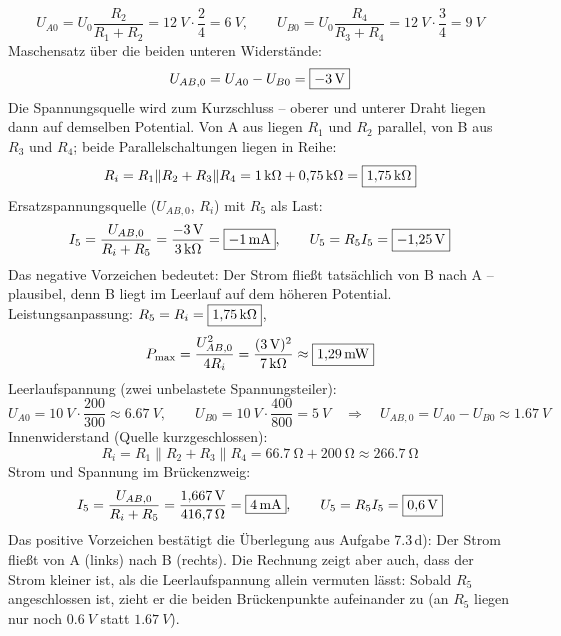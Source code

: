 \documentclass[11pt,a4paper]{article}
\begin{document}
\begin{loesung}
\[
  U_{A0} = U_0\frac{R_2}{R_1+R_2} = \SI{12}{V}\cdot\frac{2}{4} = \SI{6}{V},\qquad
  U_{B0} = U_0\frac{R_4}{R_3+R_4} = \SI{12}{V}\cdot\frac{3}{4} = \SI{9}{V}
\]
Maschensatz über die beiden unteren Widerstände:
\[
  U_{AB,0} = U_{A0} - U_{B0} = \boxed{-\SI{3}{V}}
\]
Die Spannungsquelle wird zum Kurzschluss -- oberer und unterer Draht liegen dann auf demselben Potential. Von A aus liegen $R_1$ und $R_2$ parallel, von B aus $R_3$ und $R_4$; beide Parallelschaltungen liegen in Reihe:
\[
  R_i = R_1\|R_2 + R_3\|R_4 = \SI{1}{k\ohm} + \SI{0.75}{k\ohm} = \boxed{\SI{1.75}{k\ohm}}
\]
Ersatzspannungsquelle ($U_{AB,0}$, $R_i$) mit $R_5$ als Last:
\[
  I_5 = \frac{U_{AB,0}}{R_i+R_5} = \frac{-\SI{3}{V}}{\SI{3}{k\ohm}} = \boxed{-\SI{1}{mA}},\qquad
  U_5 = R_5 I_5 = \boxed{-\SI{1.25}{V}}
\]
Das negative Vorzeichen bedeutet: Der Strom fließt tatsächlich von B nach A -- plausibel, denn B liegt im Leerlauf auf dem höheren Potential.
Leistungsanpassung: $R_5 = R_i = \boxed{\SI{1.75}{k\ohm}}$,
\[
  P_\text{max} = \frac{U_{AB,0}^2}{4R_i} = \frac{(\SI{3}{V})^2}{\SI{7}{k\ohm}} \approx \boxed{\SI{1.29}{mW}}
\]
Leerlaufspannung (zwei unbelastete Spannungsteiler):
\[
  U_{A0} = \SI{10}{V}\cdot\frac{200}{300} \approx \SI{6.67}{V},\qquad
  U_{B0} = \SI{10}{V}\cdot\frac{400}{800} = \SI{5}{V}
  \quad\Rightarrow\quad U_{AB,0} = U_{A0}-U_{B0} \approx \SI{1.67}{V}
\]
Innenwiderstand (Quelle kurzgeschlossen):
\[
  R_i = R_1\|R_2 + R_3\|R_4 = \SI{66.7}{\ohm} + \SI{200}{\ohm} \approx \SI{266.7}{\ohm}
\]
Strom und Spannung im Brückenzweig:
\[
  I_5 = \frac{U_{AB,0}}{R_i+R_5} = \frac{\SI{1.667}{V}}{\SI{416.7}{\ohm}} = \boxed{\SI{4}{mA}},\qquad
  U_5 = R_5 I_5 = \boxed{\SI{0.6}{V}}
\]
Das positive Vorzeichen bestätigt die Überlegung aus Aufgabe 7.3\,d): Der Strom fließt von A (links) nach B (rechts). Die Rechnung zeigt aber auch, dass der Strom kleiner ist, als die Leerlaufspannung allein vermuten lässt: Sobald $R_5$ angeschlossen ist, zieht er die beiden Brückenpunkte aufeinander zu (an $R_5$ liegen nur noch $\SI{0.6}{V}$ statt $\SI{1.67}{V}$).
\end{loesung}
\end{document}
